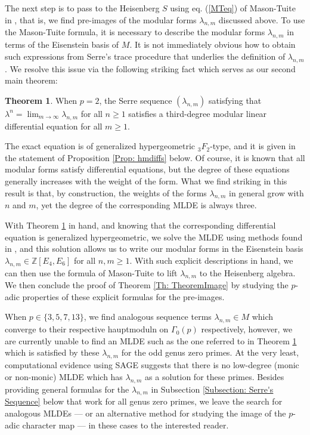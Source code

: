 \documentclass[10pt,a4paper]{amsart}
\numberwithin{equation}{section}
\theoremstyle{definition}
\newtheorem{Th}{Theorem}[section]
\newcommand{\Heis}{S}
\newcommand{\haupt}{\lambda}
\begin{document}
The next step is to pass to the Heisenberg $\Heis$ using eq. (\ref{MTeq}) of Mason-Tuite in \cite{MT}, that is, we find pre-images of the modular forms $\haupt_{n,m}$ discussed above. To use the Mason-Tuite formula, it is necessary to describe the modular forms $\haupt_{n,m}$ in terms of the Eisenstein basis of $M$. It is not immediately obvious how to obtain such expressions from Serre's trace procedure that underlies the definition of $\haupt_{n,m}$. We resolve this issue via the following striking fact which serves as our second main theorem:
\begin{Th} \label{Th: TheoremMLDE}
    When $p=2$, the Serre sequence $(\haupt_{n,m})$ satisfying that $\haupt^{n} = \lim_{m \to \infty} \haupt_{n,m}$ for all $n \geq 1$ satisfies a third-degree modular linear differential equation for all $m \geq 1$.
\end{Th}
The exact equation is of generalized hypergeometric $_{3} F_{2}$-type, and it is given in the statement of Proposition \ref{Prop: hmdiffs} below. Of course, it is known that all modular forms satisfy differential equations, but the degree of these equations generally increases with the weight of the form. What we find striking in this result is that, by construction, the weights of the forms $\haupt_{n,m}$ in general grow with $n$ and $m$, yet the degree of the corresponding MLDE is always three.

With Theorem \ref{Th: TheoremMLDE} in hand, and knowing that the corresponding differential equation is generalized hypergeometric, we solve the MLDE using methods found in \cite{FM16,KT01}, and this solution allows us to write our modular forms in the Eisenstein basis $\haupt_{n,m} \in \mathbb{Z}[E_{4},E_{6}]$ for all $n,m \geq 1$. With such explicit descriptions in hand, we can then use the formula of Mason-Tuite to lift $\haupt_{n,m}$ to the Heisenberg algebra. We then conclude the proof of Theorem \ref{Th: TheoremImage} by studying the $p$-adic properties of these explicit formulas for the pre-images.

When $p \in \lbrace 3,5,7,13 \rbrace$, we find analogous sequence terms $\haupt_{n,m} \in M$ which converge to their respective hauptmoduln on $\Gamma_{0}(p)$ respectively, however, we are currently unable to find an MLDE such as the one referred to in Theorem \ref{Th: TheoremMLDE} which is satisfied by these $\haupt_{n,m}$ for the odd genus zero primes. At the very least, computational evidence using SAGE suggests that there is no low-degree (monic or non-monic) MLDE which has $\haupt_{n,m}$ as a solution for these primes. Besides providing general formulas for the $\haupt_{n,m}$ in Subsection \ref{Subsection: Serre's Sequence} below that work for all genus zero primes, we leave the search for analogous MLDEs --- or an alternative method for studying the image of the $p$-adic character map --- in these cases to the interested reader.
\end{document}
